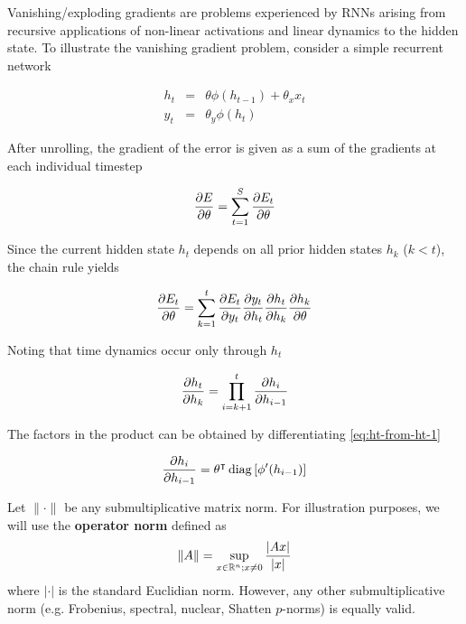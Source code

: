 Vanishing/exploding gradients \cite{Bengio1994} are problems experienced by
RNNs arising from recursive applications of non-linear activations and linear dynamics
to the hidden state. To illustrate the vanishing gradient problem, consider
a simple recurrent network

\begin{eqnarray}
    h_t &=& \theta \phi(h_{t-1}) + \theta_x x_t \label{eq:ht-from-ht-1}\\
    y_t &=& \theta_y \phi(h_t)
\end{eqnarray}

After unrolling, the gradient of the error is given as a sum of the gradients
at each individual timestep

\begin{equation}
    \frac{\partial E}{\partial \theta} = \sum_{t=1}^S \frac{\partial E_t}{\partial \theta}
\end{equation}

Since the current hidden state $h_t$ depends on all prior hidden states $h_k$ ($k < t$),
the chain rule yields

\begin{equation}
    \frac{\partial E_t}{\partial \theta} = \sum_{k=1}^t \frac{\partial E_t}{\partial y_t} \frac{\partial y_t}{\partial h_t} \frac{\partial h_t}{\partial h_k} \frac{\partial h_k}{\partial \theta}
\end{equation}

Noting that time dynamics occur only through $h_t$

\begin{equation}
    \label{eq:prod-hi}
    \frac{\partial h_t}{\partial h_k} = \prod_{i=k+1}^t \frac{\partial h_i}{\partial h_{i-1}}
\end{equation}

The factors in the product can be obtained by differentiating \autoref{eq:ht-from-ht-1}

\begin{equation}
    \frac{\partial h_i}{\partial h_{i-1}} = \theta^\intercal \operatorname*{diag}\left[ \phi'(h_{i-1}) \right]
\end{equation}

Let $\|\cdot\|$ be any submultiplicative matrix norm. For illustration purposes, we will use the
\textbf{operator norm} defined as
\begin{equation}
    \| A \| = \sup_{x \in \mathbb{R}^n; x \neq 0} \frac{|A x|}{|x|}
\end{equation}
where $|\cdot|$ is the standard Euclidian norm. However, any other submultiplicative norm
(e.g. Frobenius, spectral, nuclear, Shatten $p$-norms) is equally valid.

